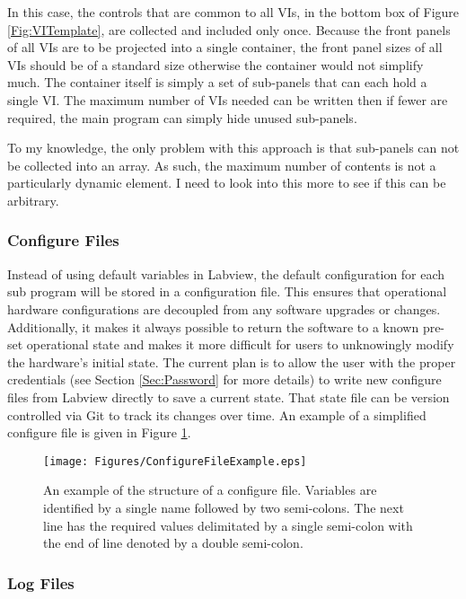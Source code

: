 In this case, the controls that are common to all VIs, in the bottom box of Figure \ref{Fig:VITemplate}, are collected and included only once. Because the front panels of all VIs are to be projected into a single container, the front panel sizes of all VIs should be of a standard size otherwise the container would not simplify much. The container itself  is simply a set of sub-panels that can each hold a single VI. The maximum number of VIs needed can be written then if fewer are required, the main program can simply hide unused sub-panels. 

To my knowledge, the only problem with this approach is that sub-panels can not be collected into an array. As such, the maximum number of contents is not a particularly dynamic element. I need to look into this more to see if this can be arbitrary. 

\subsubsection{Configure Files}
Instead of using default variables in Labview, the default configuration for each sub program will be stored in a configuration file. This ensures that operational hardware configurations are decoupled from any software upgrades or changes. Additionally, it makes it always possible to return the software to a known pre-set operational state and makes it more difficult for users to unknowingly modify the hardware's initial state. The current plan is to allow the user with the proper credentials (see Section \ref{Sec:Password} for more details) to write new configure files from Labview directly to save a current state. That state file can be version controlled via Git to track its changes over time. An example of a simplified configure file is given in Figure \ref{Fig:ConfigureFile}. 

\begin{figure}[!h]\centering
\texttt{[image: Figures/ConfigureFileExample.eps]}
\caption{An example of the structure of a configure file. Variables are identified by a single name followed by two semi-colons. The next line has the required values delimitated by a single semi-colon with the end of line denoted by a double semi-colon.}\label{Fig:ConfigureFile}
\end{figure}

\subsubsection{Log Files}

